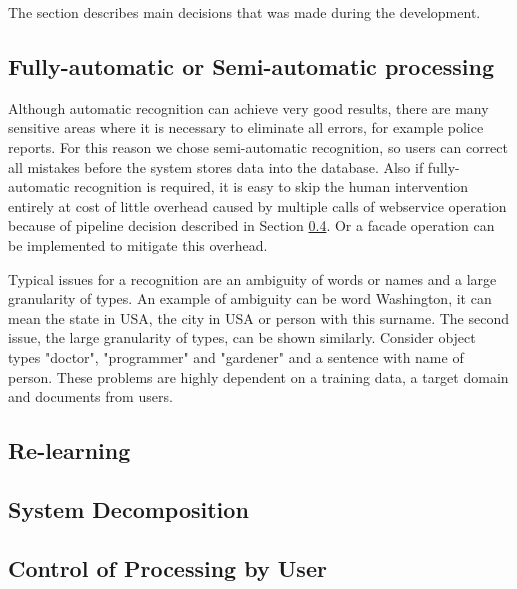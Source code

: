 
The section describes main decisions that was made during the development. 

\subsection{Fully-automatic or Semi-automatic processing}

Although automatic recognition can achieve very good results, there are many
sensitive areas where it is necessary to eliminate all errors, for example
police reports. For this reason we chose semi-automatic recognition, so users
can correct all mistakes before the system stores data into the database. 
Also if fully-automatic recognition is required, it is easy
to skip the human intervention entirely at cost of little overhead caused by
multiple calls of webservice operation because of pipeline decision described in
Section \ref{ssec:ReportPipeline}. Or a facade operation can be implemented to
mitigate this overhead.

Typical issues for a recognition are an ambiguity of words or names and a large
granularity of types. An example of ambiguity can be word Washington, it can mean
the state in USA, the city in USA or person with this surname. The second issue,
the large granularity of types, can be shown similarly. Consider object types "doctor",
"programmer" and "gardener" and a sentence with name of person. These problems are
highly dependent on a training data, a target domain and documents from users.

\subsection{Re-learning}

\subsection{System Decomposition}


\subsection{Control of Processing by User}
\label{ssec:ReportPipeline}



